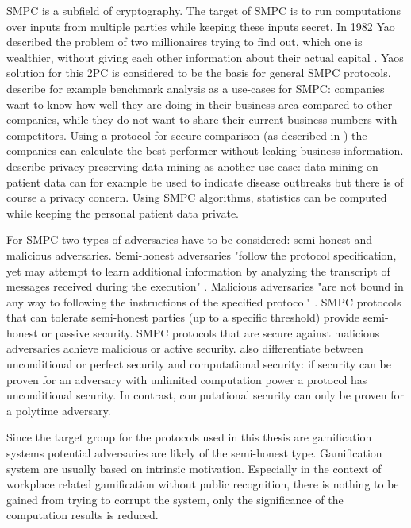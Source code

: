 		\gls{SMPC} is a subfield of cryptography. The target of \gls{SMPC} is to run computations over inputs from multiple parties while keeping these inputs secret. In 1982 Yao described the problem of two millionaires trying to find out, which one is wealthier, without giving each other information about their actual capital \autocite{Yao1982}. Yaos solution for this \gls{2PC} is considered to be the basis for general \gls{SMPC} protocols.
		\textcite{Cramer2015} describe for example benchmark analysis as a use-cases for \gls{SMPC}: companies want to know how well they are doing in their business area compared to other companies, while they do not want to share their current business numbers with competitors. Using a protocol for secure comparison (as described in ) the companies can calculate the best performer without leaking business information. 
		\textcite{Clifton2002} describe privacy preserving data mining as another use-case: data mining on patient data can for example be used to indicate disease outbreaks but there is of course a privacy concern. Using \gls{SMPC} algorithms, statistics can be computed while keeping the personal patient data private.
		
		For \gls{SMPC} two types of adversaries have to be considered: semi-honest and malicious adversaries.
		Semi-honest adversaries "follow the protocol specification, yet may attempt to learn additional information by analyzing the transcript of messages received during the execution" \autocite{Aumann2007}. Malicious adversaries "are not bound in any way to following the instructions of the specified protocol" \autocite{Aumann2007}.
		\gls{SMPC} protocols that can tolerate semi-honest parties (up to a specific threshold) provide semi-honest or passive security. \gls{SMPC} protocols that are secure against malicious adversaries achieve malicious or active security.
		\textcite[p. 82]{Cramer2015} also differentiate between unconditional or perfect security and computational security: if security can be proven for an adversary with unlimited computation power a protocol has unconditional security. In contrast, computational security can only be proven for a polytime adversary.
		
		Since the target group for the protocols used in this thesis are gamification systems potential adversaries are likely of the semi-honest type. Gamification system are usually based on intrinsic motivation. Especially in the context of workplace related gamification without public recognition, there is nothing to be gained from trying to corrupt the system, only the significance of the computation results is reduced.
		
